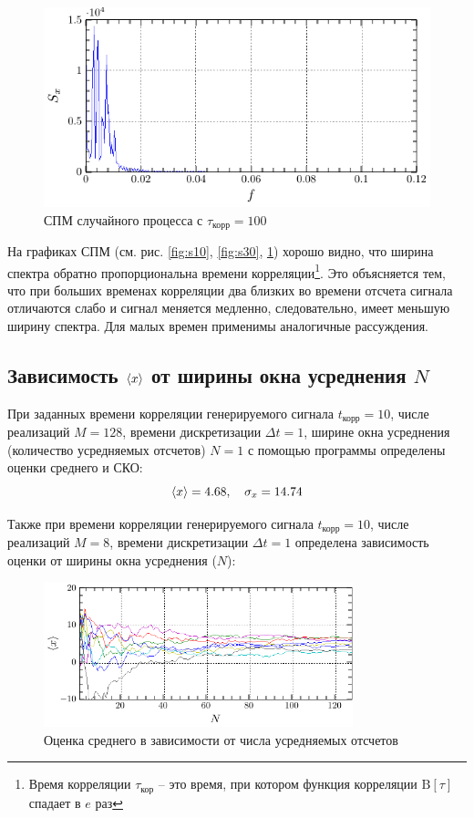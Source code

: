 \documentclass[a4paper,14pt]{extarticle}
\begin{document}
\begin{figure}[H]
    \centering
    \includegraphics[width=0.7\linewidth]{fig/S_from_f_100.pdf}
    \vspace{-0.7em}
    \caption{СПМ случайного процесса с $\tau_\text{корр}=100$}
    \label{fig:s100}
\end{figure}

На графиках СПМ (см. рис. \ref{fig:s10}, \ref{fig:s30}, \ref{fig:s100}) хорошо видно, что ширина спектра обратно пропорциональна времени корреляции\footnote{Время корреляции $\tau_\text{кор}$  -- это время, при котором функция корреляции $\mathrm{B}[\tau]$ спадает в $e$ раз}. Это объясняется тем, что при больших временах корреляции два близких во времени отсчета сигнала отличаются слабо и сигнал меняется медленно, следовательно, имеет меньшую ширину спектра. Для малых времен применимы аналогичные рассуждения.


\subsection{Зависимость $\langle x\rangle$ от ширины окна усреднения $N$}
При заданных времени корреляции генерируемого сигнала $t_\text{корр}=10$, числе реализаций $M=128$, времени дискретизации $\Delta t=1$, ширине окна усреднения (количество усредняемых отсчетов) $N=1$ с помощью программы определены оценки среднего и СКО:
\begin{equation}
    \langle x\rangle=4.68, \quad \sigma_x = 14.74
\end{equation}

Также при времени корреляции генерируемого сигнала $t_\text{корр}=10$, числе реализаций $M=8$, времени дискретизации $\Delta t=1$ определена зависимость оценки от ширины окна усреднения ($N$):
\begin{figure}[H]
    \centering
    \includegraphics[width=0.8\textwidth]{fig/mean_from_N}
    \caption{Оценка среднего в зависимости от числа усредняемых отсчетов}
    \label{fig:mean_from_n}
\end{figure}
\end{document}
